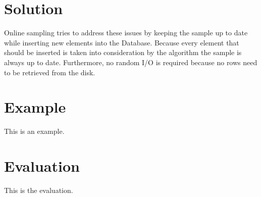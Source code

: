 \documentclass[acmlarge,nonacm]{acmart}
\begin{document}
    \section{Solution}
        Online sampling tries to address these issues by keeping the sample up to date while inserting new elements into the Database. Because every element that should be inserted is taken into consideration by the algorithm the sample is always up to date. Furthermore, no random I/O is required because no rows need to be retrieved from the disk.

        
    
    \section{Example}
        This is an example.

    \section{Evaluation}
        This is the evaluation.
\end{document}
